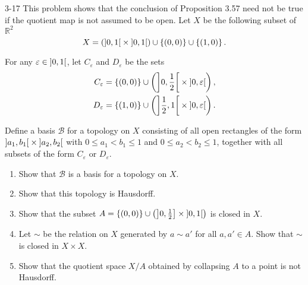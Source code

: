 \begin{problem}{3-17}
This problem shows that the conclusion of Proposition 3.57 need not be true if the quotient map is not assumed to be open. Let $X$ be the following subset of $\mathbb{R}^{2}$
\begin{equation*}
	X = \left(\left]{0, 1}\right[ \times \left]{0, 1}\right[\right) \cup \left\{{(0, 0)}\right\} \cup \left\{{(1, 0)}\right\}.
\end{equation*}

For any $\varepsilon \in \left]{0, 1}\right[$, let $C_{\varepsilon}$ and $D_{\varepsilon}$ be the sets
\begin{align*}
	C_{\varepsilon} & = \left\{{(0, 0)}\right\} \cup \left(\left]{0, \frac{1}{2}}\right[\times \left]{0, \varepsilon}\right[\right), \\
	D_{\varepsilon} & = \left\{{(1, 0)}\right\} \cup \left(\left]{\frac{1}{2}, 1}\right[\times \left]{0, \varepsilon}\right[\right).
\end{align*}

Define a basis $\mathscr{B}$ for a topology on $X$ consisting of all open rectangles of the form $\left]{a_{1}, b_{1}}\right[ \times \left]{a_{2}, b_{2}}\right[$ with $0\leq a_{1} < b_{1}\leq 1$ and $0\leq a_{2} < b_{2} \leq 1$, together with all subsets of the form $C_{\varepsilon}$ or $D_{\varepsilon}$.
\begin{enumerate}[label={(\alph*)}]
	\item Show that $\mathscr{B}$ is a basis for a topology on $X$.
	\item Show that this topology is Hausdorff.
	\item Show that the subset $A = \left\{{(0, 0)}\right\} \cup \left( \left]{0, \frac{1}{2}}\right] \times \left]{0,1}\right[ \right)$ is closed in $X$.
	\item Let $\sim$ be the relation on $X$ generated by $a \sim a'$ for all $a, a'\in A$. Show that $\sim$ is closed in $X\times X$.
	\item Show that the quotient space $X/A$ obtained by collapsing $A$ to a point is not Hausdorff.
\end{enumerate}
\end{problem}


